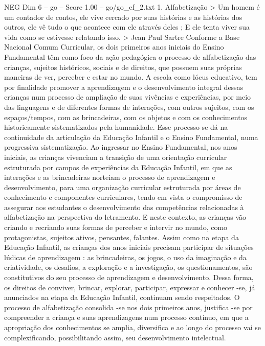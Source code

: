 \begin{textsample}{NEG Dim 6 – go – Score 1.00 – go/go\_ef\_2.txt}  \label{ex:f6_neg_179}
1.
Alfabetização > Um homem é um contador de contos, ele vive cercado por suas histórias e as histórias dos outros, ele vê tudo o que acontece com ele através deles ; E ele tenta viver sua vida como se estivesse relatando isso. > Jean Paul Sartre Conforme a Base Nacional Comum Curricular, os dois primeiros anos iniciais do Ensino Fundamental têm como foco da ação pedagógica o processo de alfabetização das crianças, sujeitos históricos, sociais e de direitos, que possuem suas próprias maneiras de ver, perceber e estar no mundo.
A escola como lócus educativo, tem por finalidade promover a aprendizagem e o desenvolvimento integral dessas crianças num processo de ampliação de suas vivências e experiências, por meio das linguagens e de diferentes formas de interações, com outros sujeitos, com os espaços/tempos, com as brincadeiras, com os objetos e com os conhecimentos historicamente sistematizados pela humanidade.
Esse processo se dá na continuidade da articulação da Educação Infantil e o Ensino Fundamental, numa progressiva sistematização.
Ao ingressar no Ensino Fundamental, nos anos iniciais, as crianças vivenciam a transição de uma orientação curricular estruturada por campos de experiências da Educação Infantil, em que as interações e as brincadeiras norteiam o processo de aprendizagem e desenvolvimento, para uma organização curricular estruturada por áreas de conhecimento e componentes curriculares, tendo em vista o compromisso de assegurar aos estudantes o desenvolvimento das competências relacionadas à alfabetização na perspectiva do letramento.
E neste contexto, as crianças vão criando e recriando suas formas de perceber e intervir no mundo, como protagonistas, sujeitos ativos, pensantes, falantes.
Assim como na etapa da Educação Infantil, as crianças dos anos iniciais precisam participar de situações lúdicas de aprendizagem : as brincadeiras, os jogos, o uso da imaginação e da criatividade, os desafios, a exploração e a investigação, os questionamentos, são constitutivos do seu processo de aprendizagem e desenvolvimento.
Dessa forma, os direitos de conviver, brincar, explorar, participar, expressar e conhecer -se, já anunciados na etapa da Educação Infantil, continuam sendo respeitados.
O processo de alfabetização consolida -se nos dois primeiros anos, justifica -se por compreender a criança e suas aprendizagens num processo contínuo, em que a apropriação dos conhecimentos se amplia, diversifica e ao longo do processo vai se complexificando, possibilitando assim, seu desenvolvimento intelectual.

\end{textsample}
